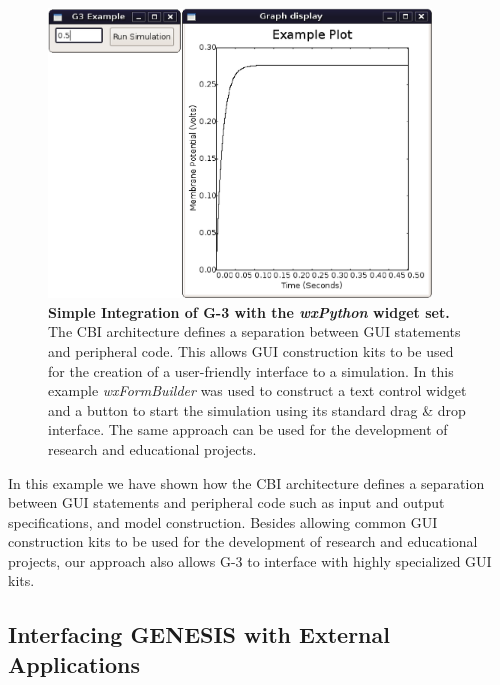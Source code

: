 \documentclass[10pt]{article}
\begin{document}
\begin{figure}[ht]
  \begin{center}
    \includegraphics[width=4in]{figures/Screenshot-Graph-display-merged.eps}
  \end{center}
  \caption{ {\bf Simple Integration of G-3 with the {\it wxPython}
      widget set.}  The CBI architecture defines a separation between
    GUI statements and peripheral code.  This allows GUI construction
    kits to be used for the creation of a user-friendly interface to a
    simulation.  In this example {\it wxFormBuilder} was used to
    construct a text control widget and a button to start the
    simulation using its standard drag \& drop interface.  The same
    approach can be used for the development of research and
    educational projects.  }
  \label{fig:g3-wx}
\end{figure}

In this example we have shown how the CBI architecture defines a
separation between GUI statements and peripheral code such as input
and output specifications, and model construction.  Besides allowing
common GUI construction kits to be used for the development of
research and educational projects, our approach also allows G-3 to
interface with highly specialized GUI kits.


\subsection*{Interfacing GENESIS with External Applications}

\end{document}
